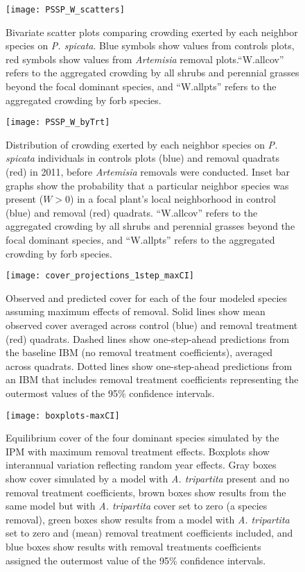 \documentclass[11pt]{article}
\begin{document}
  \begin{figure}[tbp]
  \centering
  \texttt{[image: PSSP\_W\_scatters]}
  \caption{Bivariate scatter plots comparing crowding exerted by each neighbor species on \textit{P. spicata}. Blue symbols show values from controls plots, red symbols show values from \textit{Artemisia} removal plots.``W.allcov'' refers to the aggregated crowding by all shrubs and perennial grasses beyond the focal dominant species, and ``W.allpts'' refers to the aggregated crowding by forb species.  }
  \label{fig:Wscatters}
  \end{figure}
  
  \begin{figure}[tbp]
 \centering
 \texttt{[image: PSSP\_W\_byTrt]}
 \caption{Distribution of crowding exerted by each neighbor species on \textit{P. spicata} individuals in controls plots (blue) and removal quadrats (red) in 2011, before \textit{Artemisia}  removals were conducted. Inset bar graphs show the probability that a particular neighbor species was present ($W>0$) in a focal plant's local neighborhood in control (blue) and removal (red) quadrats. ``W.allcov'' refers to the aggregated crowding by all shrubs and perennial grasses beyond the focal dominant species, and ``W.allpts'' refers to the aggregated crowding by forb species.  }
 \label{fig:W-by-treatment}
 \end{figure}

 \begin{figure}[tbp]
 \centering
 \texttt{[image: cover\_projections\_1step\_maxCI]}
 \caption{Observed and predicted cover for each of the four modeled species assuming maximum effects of removal. Solid lines show mean observed cover averaged across control (blue) and removal treatment (red) quadrats. Dashed lines show one-step-ahead predictions from the baseline IBM (no removal treatment coefficients), averaged across quadrats. Dotted lines show one-step-ahead predictions from an IBM that includes removal treatment coefficients representing the outermost values of the 95\% confidence intervals. }
 \label{fig:IBM1step-maxCI}
 \end{figure}
 
  \begin{figure}[tbp]
  \centering
  \texttt{[image: boxplots-maxCI]}
  \caption{Equilibrium cover of the four dominant species simulated by the IPM with maximum removal treatment effects. Boxplots show interannual variation reflecting random year effects. Gray boxes show cover simulated by a model with \textit{A. tripartita} present and no removal treatment coefficients, brown boxes show results from the same model but with \textit{A. tripartita} cover set to zero (a species removal), green boxes show results from a model with  \textit{A. tripartita} set to zero and (mean) removal treatment coefficients included, and blue boxes show results with removal treatments coefficients assigned the outermost value of the 95\% confidence intervals.  }
  \label{fig:IPMresults-maxCI}
  \end{figure}
\end{document}
